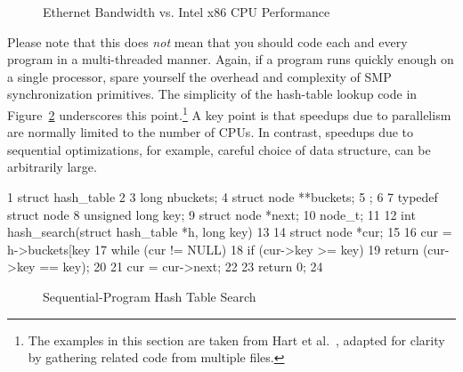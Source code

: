 \begin{figure}[htb]
\begin{center}
\end{center}
\caption{Ethernet Bandwidth vs. Intel x86 CPU Performance}
\label{fig:SMPdesign:Ethernet Bandwidth vs. Intel x86 CPU Performance}
\end{figure}

Please note that this does \emph{not} mean that you should code each
and every program in a multi-threaded manner.
Again, if a program runs quickly enough on a single processor,
spare yourself the overhead and complexity of SMP synchronization
primitives.
The simplicity of the hash-table lookup code in
Figure~\ref{fig:SMPdesign:Sequential-Program Hash Table Search}
underscores this point.\footnote{
	The examples in this section are taken from Hart et
	al.~\cite{ThomasEHart2006a}, adapted for clarity
	by gathering related code from multiple files.}
A key point is that speedups due to parallelism are normally
limited to the number of CPUs.
In contrast, speedups due to sequential optimizations, for example,
careful choice of data structure, can be arbitrarily large.

{ \scriptsize
\begin{verbbox}
  1 struct hash_table
  2 {
  3   long nbuckets;
  4   struct node **buckets;
  5 };
  6
  7 typedef struct node {
  8   unsigned long key;
  9   struct node *next;
 10 } node_t;
 11
 12 int hash_search(struct hash_table *h, long key)
 13 {
 14   struct node *cur;
 15
 16   cur = h->buckets[key %
 17   while (cur != NULL) {
 18     if (cur->key >= key) {
 19       return (cur->key == key);
 20     }
 21     cur = cur->next;
 22   }
 23   return 0;
 24 }
\end{verbbox}
}
\begin{figure}[htbp]
\centering
\theverbbox
\caption{Sequential-Program Hash Table Search}
\label{fig:SMPdesign:Sequential-Program Hash Table Search}
\end{figure}

